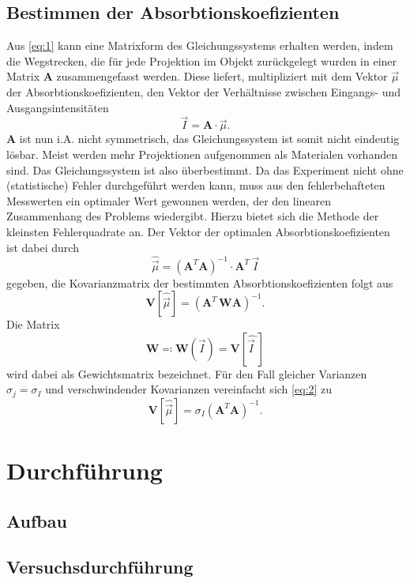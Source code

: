 \subsection{Bestimmen der Absorbtionskoefizienten}
Aus \eqref{eq:1} kann eine Matrixform des Gleichungssystems erhalten werden, indem
die Wegstrecken, die für jede Projektion im Objekt zurückgelegt wurden in einer
Matrix $\mathbf{A}$ zusammengefasst werden.
Diese liefert, multipliziert mit dem Vektor
$\vec{\mu}$ der Absorbtionskoefizienten, den Vektor der Verhältnisse zwischen
Eingangs- und Ausgangsintensitäten
\begin{equation}
  \vec{I} = \mathbf{A} \cdot \vec{\mu}.
\end{equation}
$\mathbf{A}$ ist nun i.A. nicht symmetrisch, das Gleichungssystem ist somit nicht
eindeutig lösbar.
Meist werden mehr Projektionen aufgenommen als Materialen vorhanden sind.
Das Gleichungssystem ist also überbestimmt.
Da das Experiment nicht ohne (statistische) Fehler durchgeführt werden kann,
muss aus den fehlerbehafteten Messwerten ein optimaler Wert gewonnen werden, der
den linearen Zusammenhang des Problems wiedergibt.
Hierzu bietet sich die Methode der kleinsten Fehlerquadrate an.
Der Vektor der optimalen Absorbtionskoefizienten ist dabei durch
\begin{equation}
  \hat{\vec{\mu}} = \left(\mathbf{A}^{T} \mathbf{A} \right)^{-1} \cdot \mathbf{A}^{T} \, \vec{I}
\end{equation}
gegeben, die Kovarianzmatrix der bestimmten Absorbtionskoefizienten folgt aus
\begin{equation}
  \label{eq:2}
  \mathbf{V} \left[ \hat{\vec{\mu}} \right] = \left(\mathbf{A}^{T} \, \mathbf{W} \mathbf{A} \right)^{-1}.
\end{equation}
Die Matrix
\begin{equation}
  \mathbf{W} \eqcolon \mathbf{W} \left(\vec{I} \right) = \mathbf{V}\left[\hat{\vec{I}\:\!}\right]
\end{equation}
wird dabei als Gewichtsmatrix bezeichnet.
Für den Fall gleicher Varianzen $\sigma_{j} = \sigma_{I}$ und verschwindender
Kovarianzen vereinfacht sich \eqref{eq:2} zu
\begin{equation}
  \mathbf{V}\left[\hat{\vec{\mu}}\right] = \sigma_{I} \left(\mathbf{A}^{T} \mathbf{A} \right)^{-1}.
\end{equation}


\section{Durchführung}
\subsection{Aufbau}
\subsection{Versuchsdurchführung}
